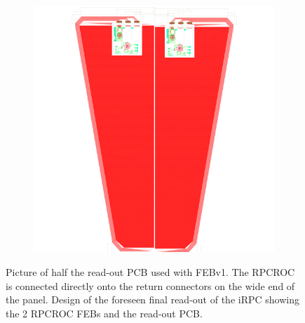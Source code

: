 \begin{figure}[H]
\begin{subfigure}{0.6\linewidth}
			\includegraphics[width = \linewidth]{fig/chapt6/iRPC-RPCROC-Final.png}
			\caption{\label{fig:RPCROC_FEB:B}}
		\end{subfigure}
		\caption{\label{fig:RPCROC_FEB}  Picture of half the read-out PCB used with FEBv1. The RPCROC is connected directly onto the return connectors on the wide end of the panel.  Design of the foreseen final read-out of the iRPC showing the 2 RPCROC FEBs and the read-out PCB.}
	\end{figure}
	
